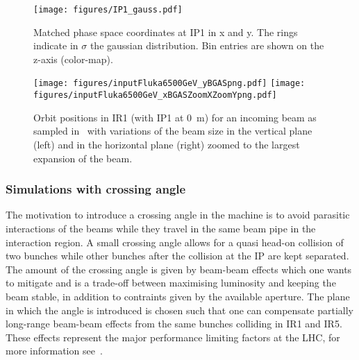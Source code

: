 \begin{figure}%
\begin{center}
\texttt{[image: figures/IP1\_gauss.pdf]}
\end{center}
\vspace{-0.6cm}
 \caption{Matched phase space coordinates at IP1 in x and y. The rings indicate in $\sigma$ the gaussian distribution. Bin entries are shown on the z-axis (color-map).
  \label{ip1_gauss}}
\end{figure}


\begin{figure}[!htb]
\begin{center}
  \texttt{[image: figures/inputFluka6500GeV\_yBGASpng.pdf]}
  \texttt{[image: figures/inputFluka6500GeV\_xBGASZoomXZoomYpng.pdf]}
\end{center}
\vspace{-0.6cm}
 \caption{Orbit positions in IR1 (with IP1 at 0~m) for an incoming beam as sampled in \fluka~with variations of the beam size in the vertical plane (left) and in the horizontal plane (right) zoomed to the largest expansion of the beam.
  \label{BGASflukaInp}}
\end{figure}


\subsubsection{Simulations with crossing angle}
The motivation to introduce a crossing angle in the machine is to avoid parasitic interactions of the beams while they travel in the same beam pipe in the interaction region. A small crossing angle allows for a quasi head-on collision of two bunches while other bunches after the collision at the IP are kept separated. The amount of the crossing angle is given by beam-beam effects which one wants to mitigate and is a trade-off between maximising luminosity and keeping the beam stable, in addition to contraints given by the available aperture. The plane in which the angle is introduced is chosen such that one can compensate partially long-range beam-beam effects from the same bunches colliding in IR1 and IR5. These effects represent the major performance limiting factors at the LHC, for more information see~\cite{wherrSlides2013,wernerLHCreport}.

